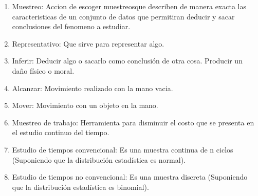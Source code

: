 \begin{enumerate}
    \item Muestreo: Accion de escoger muestreosque describen de manera exacta las caracteristicas de un conjunto de datos que permitiran deducir y sacar conclusiones del fenomeno a estudiar.
    \cite{DiapositivasSema-4-04}
    \item Representativo: Que sirve para representar algo.
    \cite{DiapositivasSema-4-04}
    \item Inferir:  Deducir algo o sacarlo como conclusión de otra cosa. Producir un daño físico o moral.
    \cite{asalerae2023}
    \item Alcanzar: Movimiento realizado con la mano vacia.
    \cite{asale_rae_2023}
    \item Mover: Movimiento con un objeto en la mano.
    \cite{DiapositivasSema-2-22}
    \item Muestreo de trabajo: Herramienta para disminuir el costo que se presenta en el estudio continuo del tiempo.
    \cite{DiapositivasSema-4-04}
    \item Estudio de tiempos convencional: Es una muestra continua de n ciclos (Suponiendo que la distribución estadística es normal).
    \cite{DiapositivasSema-4-04}
    \item Estudio de tiempos no convencional: Es una muestra discreta (Suponiendo que la distribución estadística es binomial).
    \cite{DiapositivasSema-4-04}
\end{enumerate}


